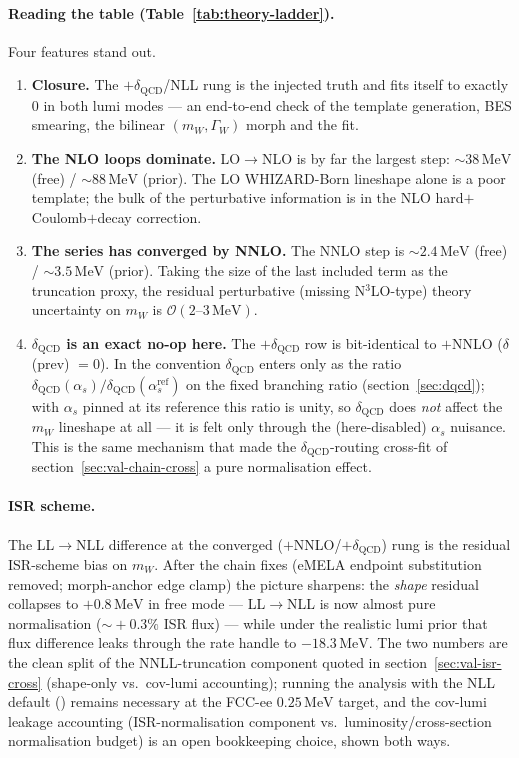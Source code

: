 \documentclass[11pt,a4paper]{article}
\newcommand{\code}[1]{\texttt{\detokenize{#1}}}
\newcommand{\mW}{m_W}
\newcommand{\GammaW}{\Gamma_W}
\newcommand{\MeV}{\ensuremath{\,\mathrm{MeV}}}
\begin{document}
\paragraph{Reading the table (Table~\ref{tab:theory-ladder}).}
Four features stand out.
\begin{enumerate}\itemsep1pt
  \item \textbf{Closure.} The $+\delta_\text{QCD}$/NLL rung is the
  injected truth and fits itself to exactly $0$ in both lumi modes ---
  an end-to-end check of the template generation, BES smearing, the
  bilinear $(\mW,\GammaW)$ morph and the fit.
  \item \textbf{The NLO loops dominate.} LO$\to$NLO is by far the largest
  step: $\sim\!38\MeV$ (free) / $\sim\!88\MeV$ (prior). The LO
  WHIZARD-Born lineshape alone is a poor template; the bulk of the
  perturbative information is in the NLO hard$+$Coulomb$+$decay
  correction.
  \item \textbf{The series has converged by NNLO.} The NNLO step is
  $\sim\!2.4\MeV$ (free) / $\sim\!3.5\MeV$ (prior). Taking the size of
  the last included term as the truncation proxy, the residual
  perturbative (missing N$^3$LO-type) theory uncertainty on $\mW$ is
  $\mathcal{O}(2\text{--}3\MeV)$.
  \item \textbf{$\delta_\text{QCD}$ is an exact no-op here.} The
  $+\delta_\text{QCD}$ row is bit-identical to $+$NNLO ($\delta$(prev)
  $=0$). In the \code{pdg-constant} convention $\delta_\text{QCD}$ enters
  only as the ratio
  $\delta_\text{QCD}(\alpha_s)/\delta_\text{QCD}(\alpha_s^\text{ref})$
  on the fixed branching ratio (section~\ref{sec:dqcd}); with $\alpha_s$
  pinned at its reference this ratio is unity, so $\delta_\text{QCD}$
  does \emph{not} affect the $\mW$ lineshape at all --- it is felt only
  through the (here-disabled) $\alpha_s$ nuisance. This is the same
  mechanism that made the $\delta_\text{QCD}$-routing cross-fit of
  section~\ref{sec:val-chain-cross} a pure normalisation effect.
\end{enumerate}

\paragraph{ISR scheme.}
The LL$\to$NLL difference at the converged ($+$NNLO/$+\delta_\text{QCD}$)
rung is the residual ISR-scheme bias on $\mW$. After the chain
fixes (eMELA endpoint substitution removed; morph-anchor edge clamp) the
picture sharpens: the \emph{shape} residual collapses to
$+0.8\MeV$ in free mode --- LL$\to$NLL is now almost pure normalisation
($\sim\!+0.3\%$ ISR flux) --- while under the realistic lumi prior that
flux difference leaks through the rate handle to $-18.3\MeV$. The two
numbers are the clean split of the NNLL-truncation component quoted in
section~\ref{sec:val-isr-cross} (shape-only vs.\ cov-lumi accounting);
running the analysis with the NLL default (\code{isr_nll=True}) remains
necessary at the FCC-ee $0.25\MeV$ target, and the cov-lumi leakage
accounting (ISR-normalisation component vs.\ luminosity/cross-section
normalisation budget) is an open bookkeeping choice, shown both ways.
\end{document}
